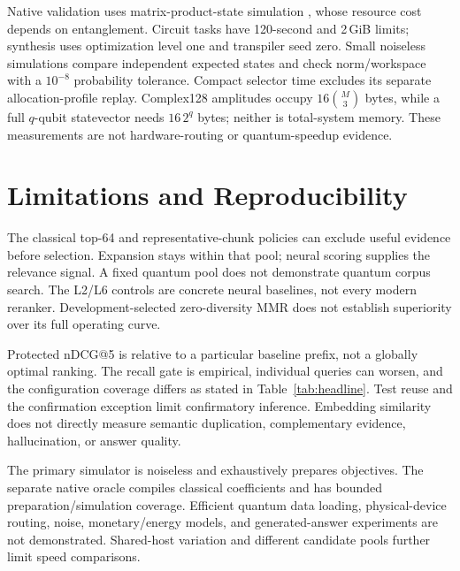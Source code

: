 \documentclass[conference]{IEEEtran}
\newcommand{\resultinput}[1]{}
\begin{document}
\begin{table}[t]
\centering\small\setlength{\tabcolsep}{3pt}
\caption{Measured constrained-oracle synthesis. Slash-separated values compare 4/16-bit coefficients; intermediate precisions are retained in companion records. Qubits include all workspace; depth/CX are observed maxima in the unrestricted \(u,cx\) basis. Stress denotes artificial data.}
\label{tab:resources_analytic}
\resultinput{resources_analytic.tex}
\end{table}

\resultinput{resource_findings.tex}
Native validation uses matrix-product-state simulation \cite{vidal2003simulation}, whose resource cost depends on entanglement. Circuit tasks have 120-second and 2\,GiB limits; synthesis uses optimization level one and transpiler seed zero. Small noiseless simulations compare independent expected states and check norm/workspace with a \(10^{-8}\) probability tolerance. Compact selector time excludes its separate allocation-profile replay. Complex128 amplitudes occupy \(16\binom{M}{3}\) bytes, while a full \(q\)-qubit statevector needs \(16\,2^q\) bytes; neither is total-system memory. These measurements are not hardware-routing or quantum-speedup evidence.

\raggedbottom
\section{Limitations and Reproducibility}\label{sec:limits}
The classical top-64 and representative-chunk policies can exclude useful evidence before selection. Expansion stays within that pool; neural scoring supplies the relevance signal. A fixed quantum pool does not demonstrate quantum corpus search. The L2/L6 controls are concrete neural baselines, not every modern reranker. Development-selected zero-diversity MMR does not establish superiority over its full operating curve.

Protected nDCG@5 is relative to a particular baseline prefix, not a globally optimal ranking. The recall gate is empirical, individual queries can worsen, and the configuration coverage differs as stated in Table~\ref{tab:headline}. Test reuse and the confirmation exception limit confirmatory inference. Embedding similarity does not directly measure semantic duplication, complementary evidence, hallucination, or answer quality.

The primary simulator is noiseless and exhaustively prepares objectives. The separate native oracle compiles classical coefficients and has bounded preparation/simulation coverage. Efficient quantum data loading, physical-device routing, noise, monetary/energy models, and generated-answer experiments are not demonstrated. Shared-host variation and different candidate pools further limit speed comparisons.
\end{document}
